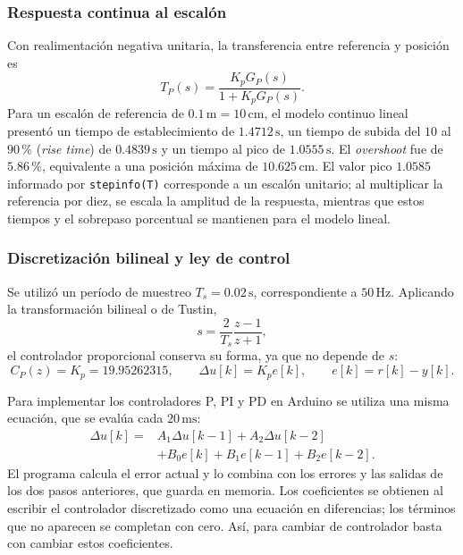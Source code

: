 \documentclass[a4paper, twoside, 10pt, spanish]{article}
\numberwithin{table}{section}
\begin{document}
    \subsubsection{Respuesta continua al escalón}
    Con realimentación negativa unitaria, la transferencia entre referencia y posición es
    \[
        T_P(s)=\frac{K_pG_P(s)}{1+K_pG_P(s)}.
    \]
    Para un escalón de referencia de $0.1\,\text{m}=10\,\text{cm}$, el modelo continuo lineal presentó un tiempo de establecimiento de $1.4712\,\text{s}$, un tiempo de subida del $10$ al $90\,\%$ (\textit{rise time}) de $0.4839\,\text{s}$ y un tiempo al pico de $1.0555\,\text{s}$. El \textit{overshoot} fue de $5.86\,\%$, equivalente a una posición máxima de $10.625\,\text{cm}$. El valor pico $1.0585$ informado por \texttt{stepinfo(T)} corresponde a un escalón unitario; al multiplicar la referencia por diez, se escala la amplitud de la respuesta, mientras que estos tiempos y el sobrepaso porcentual se mantienen para el modelo lineal.

    \subsubsection{Discretización bilineal y ley de control}
    Se utilizó un período de muestreo $T_s=0.02\,\text{s}$, correspondiente a $50\,\text{Hz}$. Aplicando la transformación bilineal o de Tustin,
    \[
        s=\frac{2}{T_s}\frac{z-1}{z+1},
    \]
    el controlador proporcional conserva su forma, ya que no depende de $s$:
    \begin{equation}
        C_P(z)=K_p=19.95262315,\qquad
        \Delta u[k]=K_p e[k],\qquad e[k]=r[k]-y[k].
        \label{eq:p_discreto}
    \end{equation}

    Para implementar los controladores P, PI y PD en Arduino se utiliza una misma ecuación, que se evalúa cada $20\,\text{ms}$:
    \[
        \begin{aligned}
        \Delta u[k]={}&A_1\Delta u[k-1]+A_2\Delta u[k-2]\\
                     &+B_0e[k]+B_1e[k-1]+B_2e[k-2].
        \end{aligned}
    \]
    El programa calcula el error actual y lo combina con los errores y las salidas de los dos pasos anteriores, que guarda en memoria. Los coeficientes se obtienen al escribir el controlador discretizado como una ecuación en diferencias; los términos que no aparecen se completan con cero. Así, para cambiar de controlador basta con cambiar estos coeficientes.
\end{document}
